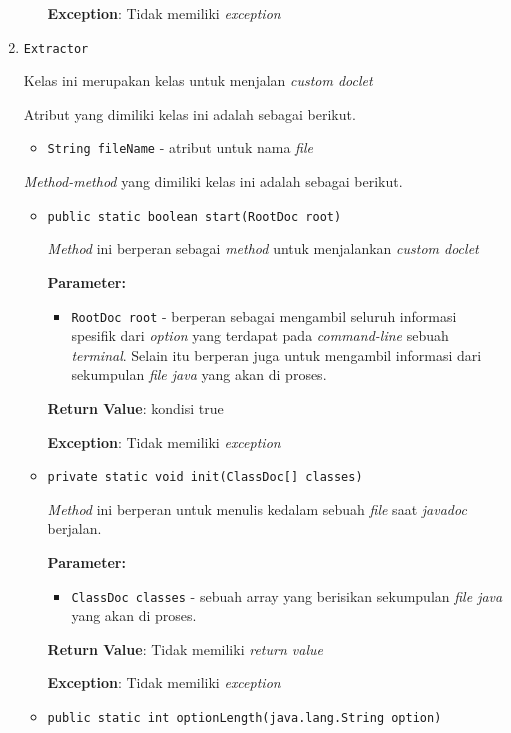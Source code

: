 \documentclass{article}
\begin{document}
\begin{enumerate}
\begin{itemize}
\textbf{Exception}: Tidak memiliki \textit{exception}

\end{itemize}
\item \texttt{Extractor}

Kelas ini merupakan kelas untuk menjalan \textit{custom doclet}

Atribut yang dimiliki kelas ini adalah sebagai berikut.
\begin{itemize}
\item \texttt{String fileName} - atribut untuk nama \textit{file}
\end{itemize}
\textit{Method-method} yang dimiliki kelas ini adalah sebagai berikut.
\begin{itemize}
\item \texttt{public static boolean start(RootDoc root)}

\textit{Method} ini berperan sebagai \textit{method} untuk menjalankan
 \textit{custom doclet}

\textbf{Parameter:}
\begin{itemize}
\item \texttt{RootDoc root} - 
berperan sebagai mengambil seluruh informasi spesifik dari
             \textit{option} yang terdapat pada \textit{command-line} sebuah
             \textit{terminal}. Selain itu berperan juga untuk mengambil informasi dari
             sekumpulan \textit{file java} yang akan di proses.
\end{itemize}
\textbf{Return Value}: kondisi true

\textbf{Exception}: Tidak memiliki \textit{exception}

\item \texttt{private static void init(ClassDoc[] classes)}

\textit{Method} ini berperan untuk menulis kedalam sebuah \textit{file}
 saat \textit{javadoc} berjalan.

\textbf{Parameter:}
\begin{itemize}
\item \texttt{ClassDoc classes} - 
sebuah array yang berisikan sekumpulan \textit{file java}
                yang akan di proses.
\end{itemize}
\textbf{Return Value}: Tidak memiliki \textit{return value}

\textbf{Exception}: Tidak memiliki \textit{exception}

\item \texttt{public static int optionLength(java.lang.String option)}


\end{itemize}
\end{enumerate}
\end{document}
